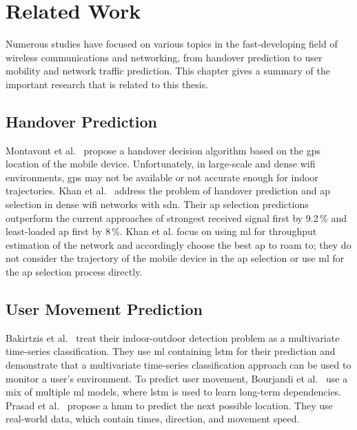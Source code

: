 \chapter{Related Work}\label{ch:related-work}

Numerous studies have focused on various topics in the fast-developing field of wireless communications and networking, from handover prediction to user mobility and network traffic prediction.
This chapter gives a summary of the important research that is related to this thesis.



\section{Handover Prediction}

Montavont et al.~\cite{handover-assisted-by-gps} propose a handover decision algorithm based on the \ac{gps} location of the mobile device.
Unfortunately, in large-scale and dense \ac{wifi} environments, \ac{gps} may not be available or not accurate enough for indoor trajectories.
Khan et al.~\cite{MLBasedHandoverPrediction2022} address the problem of handover prediction and \ac{ap} selection in dense \ac{wifi} networks with \ac{sdn}.
Their \ac{ap} selection predictions outperform the current approaches of strongest received signal first by 9.2\,\% and least-loaded \ac{ap} first by 8\,\%.
Khan et al. focus on using \ac{ml} for throughput estimation of the network and accordingly choose the best \ac{ap} to roam to; they do not consider the trajectory of the mobile device in the \ac{ap} selection or use \ac{ml} for the \ac{ap} selection process directly.

\section{User Movement Prediction}

Bakirtzis et al.~\cite{multivariate-lstm-indoor-outdoor} treat their indoor-outdoor detection problem as a multivariate time-series classification.
They use \ac{ml} containing \ac{lstm} for their prediction and demonstrate that a multivariate time-series classification approach can be used to monitor a user's environment.
To predict user movement, Bourjandi et al.~\cite{bourjandiPredictingUserMovement2022} use a mix of multiple \ac{ml} models, where \ac{lstm} is used to learn long-term dependencies.
Prasad et al.~\cite{hmm-movement-prediction} propose a \ac{hmm} to predict the next possible location.
They use real-world data, which contain times, direction, and movement speed.

